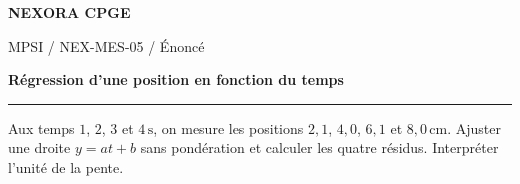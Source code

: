 \documentclass[11pt,a4paper]{article}
\begin{document}
{\small\bfseries\color{nexorablue} NEXORA CPGE}\par
{\small MPSI / NEX-MES-05 / Énoncé}\par
{\LARGE\bfseries Régression d’une position en fonction du temps}\par
\vspace{0.25em}\hrule\vspace{0.6em}

Aux temps $1$, $2$, $3$ et $4\,\mathrm s$, on mesure les positions $2{,}1$, $4{,}0$, $6{,}1$ et $8{,}0\,\mathrm{cm}$. Ajuster une droite $y=at+b$ sans pondération et calculer les quatre résidus. Interpréter l’unité de la pente.
\end{document}
